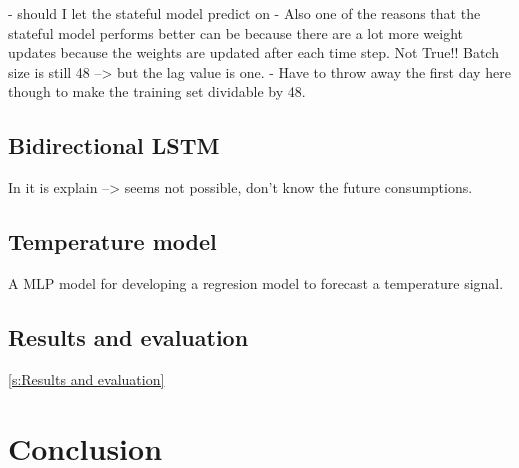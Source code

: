 - should I let the stateful model predict on 
- Also one of the reasons that the stateful model performs better can be because there are a lot more weight updates because the weights are updated after each time step. Not True!! Batch size is still 48 --> but the lag value is one.
- Have to throw away the first day here though to make the training set dividable by 48. 



\subsection{Bidirectional LSTM}
In \cite{Teuwen2019} it is explain --> seems not possible, don't know the future consumptions.


\subsection{Temperature model}
A MLP model for developing a regresion model to forecast a temperature signal. 

\subsection{Results and evaluation}\ref{s:Results and evaluation}




\section{Conclusion}


